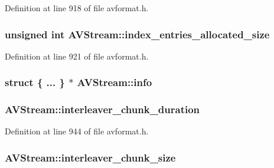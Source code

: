 Definition at line 918 of file avformat.\+h.

\subsubsection[{\texorpdfstring{index\+\_\+entries\+\_\+allocated\+\_\+size}{index_entries_allocated_size}}]{\setlength{\rightskip}{0pt plus 5cm}unsigned {\bf int} A\+V\+Stream\+::index\+\_\+entries\+\_\+allocated\+\_\+size}\hypertarget{struct_a_v_stream_a03161c9bc3f6339876506750a9c8681f}{}\label{struct_a_v_stream_a03161c9bc3f6339876506750a9c8681f}


Definition at line 921 of file avformat.\+h.

\subsubsection[{\texorpdfstring{info}{info}}]{\setlength{\rightskip}{0pt plus 5cm}struct \{ ... \}  $\ast$ A\+V\+Stream\+::info}\hypertarget{struct_a_v_stream_a23dcf9a3deb567cf0633b9faa2dd325f}{}\label{struct_a_v_stream_a23dcf9a3deb567cf0633b9faa2dd325f}
\subsubsection[{\texorpdfstring{interleaver\+\_\+chunk\+\_\+duration}{interleaver_chunk_duration}}]{ A\+V\+Stream\+::interleaver\+\_\+chunk\+\_\+duration}\hypertarget{struct_a_v_stream_a56c15542ff9ba2e0ee860cbb7532600a}{}\label{struct_a_v_stream_a56c15542ff9ba2e0ee860cbb7532600a}


Definition at line 944 of file avformat.\+h.

\subsubsection[{\texorpdfstring{interleaver\+\_\+chunk\+\_\+size}{interleaver_chunk_size}}]{ A\+V\+Stream\+::interleaver\+\_\+chunk\+\_\+size}\hypertarget{struct_a_v_stream_af131ef55cdd62eebd3b337c6eb261007}{}\label{struct_a_v_stream_af131ef55cdd62eebd3b337c6eb261007}


